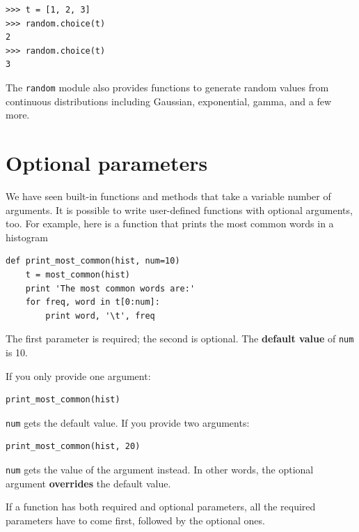 \documentclass[10pt]{book}
\begin{document}

\beforeverb
\begin{verbatim}
>>> t = [1, 2, 3]
>>> random.choice(t)
2
>>> random.choice(t)
3
\end{verbatim}
\afterverb
%
The {\tt random} module also provides functions to generate
random values from continuous distributions including
Gaussian, exponential, gamma, and a few more.

\section{Optional parameters}


We have seen built-in functions and methods that take a variable
number of arguments.  It is possible to write user-defined functions
with optional arguments, too.  For example, here is a function that
prints the most common words in a histogram

\beforeverb
\begin{verbatim}
def print_most_common(hist, num=10)
    t = most_common(hist)
    print 'The most common words are:'
    for freq, word in t[0:num]:
        print word, '\t', freq
\end{verbatim}
\afterverb

The first parameter is required; the second is optional.
The {\bf default value} of {\tt num} is 10.


If you only provide one argument:

\beforeverb
\begin{verbatim}
print_most_common(hist)
\end{verbatim}
\afterverb

{\tt num} gets the default value.  If you provide two arguments:

\beforeverb
\begin{verbatim}
print_most_common(hist, 20)
\end{verbatim}
\afterverb

{\tt num} gets the value of the argument instead.  In other
words, the optional argument {\bf overrides} the default value.


If a function has both required and optional parameters, all
the required parameters have to come first, followed by the
optional ones.
\end{document}
